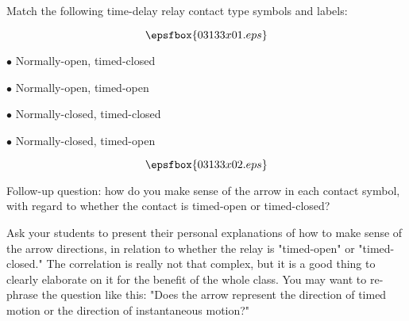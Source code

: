 

Match the following time-delay relay contact type symbols and labels:

$$\epsfbox{03133x01.eps}$$

\medskip
\item{$\bullet$} Normally-open, timed-closed
\item{$\bullet$} Normally-open, timed-open
\item{$\bullet$} Normally-closed, timed-closed
\item{$\bullet$} Normally-closed, timed-open
\medskip







$$\epsfbox{03133x02.eps}$$

\vskip 10pt

Follow-up question: how do you make sense of the arrow in each contact symbol, with regard to whether the contact is timed-open or timed-closed?







Ask your students to present their personal explanations of how to make sense of the arrow directions, in relation to whether the relay is "timed-open" or "timed-closed."  The correlation is really not that complex, but it is a good thing to clearly elaborate on it for the benefit of the whole class.  You may want to re-phrase the question like this: "Does the arrow represent the direction of timed motion or the direction of instantaneous motion?"




